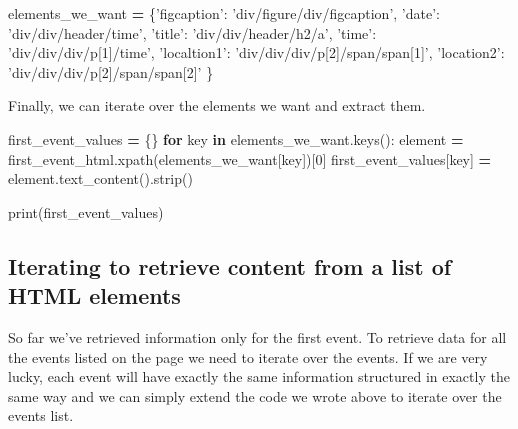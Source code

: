 \documentclass[
]{book}
\newenvironment{Shaded}{\begin{snugshade}}{\end{snugshade}}
\newcommand{\BuiltInTok}[1]{#1}
\newcommand{\ControlFlowTok}[1]{\textcolor[rgb]{0.13,0.29,0.53}{\textbf{#1}}}
\newcommand{\DecValTok}[1]{\textcolor[rgb]{0.00,0.00,0.81}{#1}}
\newcommand{\KeywordTok}[1]{\textcolor[rgb]{0.13,0.29,0.53}{\textbf{#1}}}
\newcommand{\NormalTok}[1]{#1}
\newcommand{\OperatorTok}[1]{\textcolor[rgb]{0.81,0.36,0.00}{\textbf{#1}}}
\newcommand{\StringTok}[1]{\textcolor[rgb]{0.31,0.60,0.02}{#1}}
\begin{document}
\begin{Shaded}
\begin{Highlighting}[]
\NormalTok{elements_we_want }\OperatorTok{=}\NormalTok{ \{}\StringTok{'figcaption'}\NormalTok{: }\StringTok{'div/figure/div/figcaption'}\NormalTok{,}
                    \StringTok{'date'}\NormalTok{: }\StringTok{'div/div/header/time'}\NormalTok{,}
                    \StringTok{'title'}\NormalTok{: }\StringTok{'div/div/header/h2/a'}\NormalTok{,}
                    \StringTok{'time'}\NormalTok{: }\StringTok{'div/div/div/p[1]/time'}\NormalTok{,}
                    \StringTok{'localtion1'}\NormalTok{: }\StringTok{'div/div/div/p[2]/span/span[1]'}\NormalTok{,}
                    \StringTok{'location2'}\NormalTok{: }\StringTok{'div/div/div/p[2]/span/span[2]'}
\NormalTok{                    \}}
\end{Highlighting}
\end{Shaded}

Finally, we can iterate over the elements we want and extract them.

\begin{Shaded}
\begin{Highlighting}[]
\NormalTok{first_event_values }\OperatorTok{=}\NormalTok{ \{\}}
\ControlFlowTok{for}\NormalTok{ key }\KeywordTok{in}\NormalTok{ elements_we_want.keys():}
\NormalTok{    element }\OperatorTok{=}\NormalTok{ first_event_html.xpath(elements_we_want[key])[}\DecValTok{0}\NormalTok{]}
\NormalTok{    first_event_values[key] }\OperatorTok{=}\NormalTok{ element.text_content().strip()}

\BuiltInTok{print}\NormalTok{(first_event_values)}
\end{Highlighting}
\end{Shaded}

\hypertarget{iterating-to-retrieve-content-from-a-list-of-html-elements}{%
\subsection{Iterating to retrieve content from a list of HTML elements}\label{iterating-to-retrieve-content-from-a-list-of-html-elements}}

So far we've retrieved information only for the first event. To
retrieve data for all the events listed on the page we need to iterate
over the events. If we are very lucky, each event will have exactly
the same information structured in exactly the same way and we can
simply extend the code we wrote above to iterate over the events list.
\end{document}
